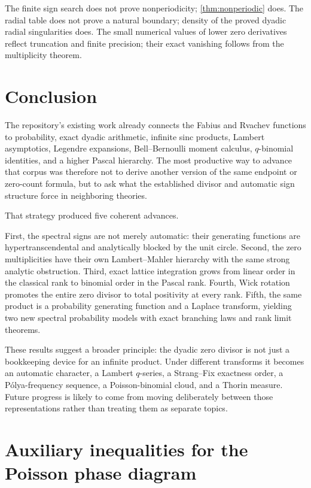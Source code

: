 \documentclass[11pt,oneside]{article}
\theoremstyle{definition}
\theoremstyle{remark}
\begin{document}
The finite sign search does not prove nonperiodicity; \cref{thm:nonperiodic}
does.  The radial table does not prove a natural boundary; density of the
proved dyadic radial singularities does.  The small numerical values of lower
zero derivatives reflect truncation and finite precision; their exact
vanishing follows from the multiplicity theorem.

\section{Conclusion}

The repository's existing work already connects the Fabius and Rvachev
functions to probability, exact dyadic arithmetic, infinite sinc products,
Lambert asymptotics, Legendre expansions, Bell--Bernoulli moment calculus,
$q$-binomial identities, and a higher Pascal hierarchy.  The most productive
way to advance that corpus was therefore not to derive another version of the
same endpoint or zero-count formula, but to ask what the established divisor
and automatic sign structure force in neighboring theories.

That strategy produced five coherent advances.

First, the spectral signs are not merely automatic: their generating
functions are hypertranscendental and analytically blocked by the unit circle.
Second, the zero multiplicities have their own Lambert--Mahler hierarchy with
the same strong analytic obstruction.  Third, exact lattice integration grows
from linear order in the classical rank to binomial order in the Pascal rank.
Fourth, Wick rotation promotes the entire zero divisor to total positivity at
every rank.  Fifth, the same product is a probability generating function and
a Laplace transform, yielding two new spectral probability models with exact
branching laws and rank limit theorems.

These results suggest a broader principle: the dyadic zero divisor is not just
a bookkeeping device for an infinite product.  Under different transforms it
becomes an automatic character, a Lambert $q$-series, a Strang--Fix exactness
order, a P\'olya-frequency sequence, a Poisson-binomial cloud, and a Thorin
measure.  Future progress is likely to come from moving deliberately between
those representations rather than treating them as separate topics.

\appendix

\section{Auxiliary inequalities for the Poisson phase diagram}
\end{document}
